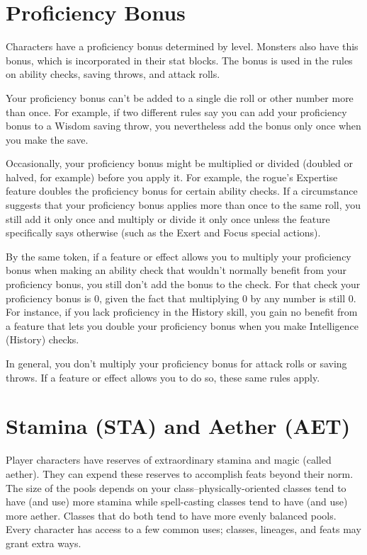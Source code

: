 \section{Proficiency Bonus}

Characters have a proficiency bonus determined by level. Monsters also have this bonus, which is incorporated in their stat blocks. The bonus is used in the rules on ability checks, saving throws, and attack rolls.

Your proficiency bonus can't be added to a single die roll or other number more than once. For example, if two different rules say you can add your proficiency bonus to a Wisdom saving throw, you nevertheless add the bonus only once when you make the save.

Occasionally, your proficiency bonus might be multiplied or divided (doubled or halved, for example) before you apply it. For example, the rogue's Expertise feature doubles the proficiency bonus for certain ability checks. If a circumstance suggests that your proficiency bonus applies more than once to the same roll, you still add it only once and multiply or divide it only once unless the feature specifically says otherwise (such as the Exert and Focus special actions).

By the same token, if a feature or effect allows you to multiply your proficiency bonus when making an ability check that wouldn't normally benefit from your proficiency bonus, you still don't add the bonus to the check. For that check your proficiency bonus is 0, given the fact that multiplying 0 by any number is still 0. For instance, if you lack proficiency in the History skill, you gain no benefit from a feature that lets you double your proficiency bonus when you make Intelligence (History) checks.

In general, you don't multiply your proficiency bonus for attack rolls or saving throws. If a feature or effect allows you to do so, these same rules apply.

\section{Stamina (STA) and Aether (AET)}
Player characters have reserves of extraordinary stamina and magic (called aether). They can expend these reserves to accomplish feats beyond their norm. The size of the pools depends on your class–physically-oriented classes tend to have (and use) more stamina while spell-casting classes tend to have (and use) more aether. Classes that do both tend to have more evenly balanced pools. Every character has access to a few common uses; classes, lineages, and feats may grant extra ways.

